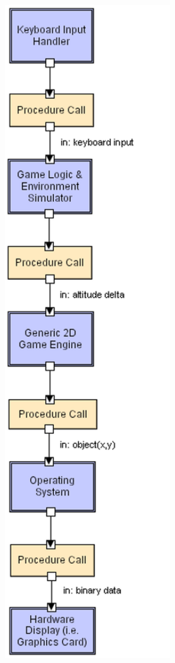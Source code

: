 \documentclass[xetex,mathserif,serif]{beamer}
\begin{document}
\begin{frame}
\begin{columns}
\begin{column}{0.19\textwidth}
\begin{center}
					\includegraphics[width=0.8\textwidth]{layeredLL.png}
				\end{center}
			\end{column}
		\end{columns}
	\end{frame}
\end{document}
